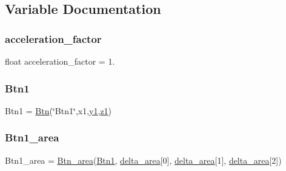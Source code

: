 \subsection{Variable Documentation}
\mbox{\label{namespaceRET__config_a425bc201cf7b10f0c4f1068f752e7c9b}} 
\subsubsection{\texorpdfstring{acceleration\+\_\+factor}{acceleration\_factor}}
{\footnotesize\ttfamily float acceleration\+\_\+factor = 1.}

\mbox{\label{namespaceRET__config_af037c6b9ff0314103d8127acc9d07e0b}} 
\subsubsection{\texorpdfstring{Btn1}{Btn1}}
{\footnotesize\ttfamily Btn1 = \hyperlink{classRET__config_1_1Btn}{Btn}(\char`\"{}Btn1\char`\"{},x1,\hyperlink{namespaceRET__config_a9fe80bf4738047a31d7c162807ed85f0}{y1},\hyperlink{namespaceRET__config_a7da4886c0a2e03b8bb9ed62eb20efb78}{z1})}

\mbox{\label{namespaceRET__config_a118140d2896d1aff1e3c9355f9deb314}} 
\subsubsection{\texorpdfstring{Btn1\+\_\+area}{Btn1\_area}}
{\footnotesize\ttfamily Btn1\+\_\+area = \hyperlink{classRET__config_1_1Btn__area}{Btn\+\_\+area}(\hyperlink{namespaceRET__config_af037c6b9ff0314103d8127acc9d07e0b}{Btn1}, \hyperlink{namespaceRET__config_abbf3fd8fafae6a457e57109bfaf9a6c5}{delta\+\_\+area}\mbox{[}0\mbox{]}, \hyperlink{namespaceRET__config_abbf3fd8fafae6a457e57109bfaf9a6c5}{delta\+\_\+area}\mbox{[}1\mbox{]}, \hyperlink{namespaceRET__config_abbf3fd8fafae6a457e57109bfaf9a6c5}{delta\+\_\+area}\mbox{[}2\mbox{]})}

